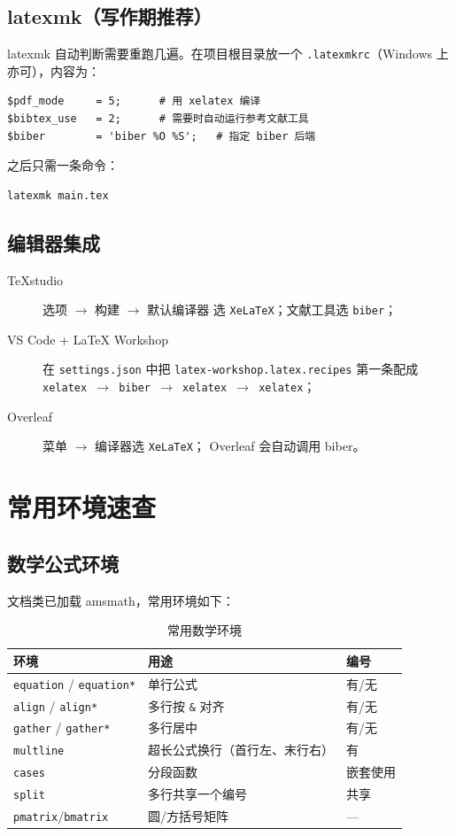 \subsection{latexmk（写作期推荐）}

latexmk 自动判断需要重跑几遍。在项目根目录放一个
\texttt{.latexmkrc}（Windows 上亦可），内容为：
\begin{lstlisting}
$pdf_mode     = 5;      # 用 xelatex 编译
$bibtex_use   = 2;      # 需要时自动运行参考文献工具
$biber        = 'biber %O %S';   # 指定 biber 后端
\end{lstlisting}
之后只需一条命令：
\begin{verbatim}
latexmk main.tex
\end{verbatim}

\subsection{编辑器集成}

\begin{description}
  \item[TeXstudio] 选项 $\rightarrow$ 构建 $\rightarrow$ 默认编译器
        选 \texttt{XeLaTeX}；文献工具选 \texttt{biber}；
  \item[VS Code + LaTeX Workshop] 在 \texttt{settings.json} 中把
        \texttt{latex-workshop.latex.recipes} 第一条配成
        \texttt{xelatex $\rightarrow$ biber $\rightarrow$ xelatex $\rightarrow$
        xelatex}；
  \item[Overleaf] 菜单 $\rightarrow$ 编译器选 \texttt{XeLaTeX}；
        Overleaf 会自动调用 biber。
\end{description}

\section{常用环境速查}

\subsection{数学公式环境}

文档类已加载 amsmath，常用环境如下：

\begin{table}[htbp]
  \centering
  \caption{常用数学环境}\label{tab:mathenv}
  \begin{tabular}{lll}
    \toprule
    环境 & 用途 & 编号 \\
    \midrule
    \texttt{equation} / \texttt{equation*} & 单行公式 & 有/无 \\
    \texttt{align} / \texttt{align*} & 多行按 \texttt{\&} 对齐 & 有/无 \\
    \texttt{gather} / \texttt{gather*} & 多行居中 & 有/无 \\
    \texttt{multline} & 超长公式换行（首行左、末行右）& 有 \\
    \texttt{cases} & 分段函数 & 嵌套使用 \\
    \texttt{split} & 多行共享一个编号 & 共享 \\
    \texttt{pmatrix}/\texttt{bmatrix} & 圆/方括号矩阵 & --- \\
    \bottomrule
  \end{tabular}
\end{table}

